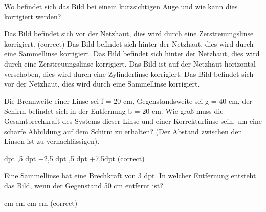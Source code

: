 \documentclass[11pt]{exam}
\begin{document}
\setlength{\voffset}{-0.5in}
\setlength{\headsep}{5pt}

\hspace{2mm}
 \hspace{5mm}
\vspace{4mm}

\begin{questions}

\question Wo befindet sich das Bild bei einem kurzsichtigen Auge und wie kann dies korrigiert werden?

\begin{choices}
	\choice Das Bild befindet sich vor der Netzhaut, dies wird durch eine Zerstreuungslinse korrigiert. (correct)
	\choice Das Bild befindet sich hinter der Netzhaut, dies wird durch eine Sammellinse korrigiert.
	\choice Das Bild befindet sich hinter der Netzhaut, dies wird durch eine Zerstreuungslinse korrigiert.
	\choice Das Bild ist auf der Netzhaut horizontal verschoben, dies wird durch eine Zylinderlinse korrigiert.
	\choice Das Bild befindet sich vor der Netzhaut, dies wird durch eine Sammellinse korrigiert.
\end{choices}

\vspace{3mm}\question Die Brennweite einer Linse sei f = 20 cm, Gegenstandsweite sei g = 40 cm, der Schirm befindet sich in der Entfernung b = 20 cm. Wie groß muss die Gesamtbrechkraft des Systems dieser Linse und einer Korrekturlinse sein, um eine scharfe Abbildung auf dem Schirm zu erhalten? (Der Abstand zwischen den Linsen ist zu vernachlässigen).

\begin{choices}
	 dpt
	,5 dpt
	\choice +2,5 dpt
	,5 dpt
	\choice +7,5dpt (correct)
\end{choices}

\vspace{3mm}\question Eine Sammellinse hat eine Brechkraft von 3 dpt. In welcher Entfernung entsteht das Bild, wenn der Gegenstand 50 cm entfernt ist?

\begin{choices}
	 cm
	 cm
	 cm
	 cm
	\choice 100cm (correct)
\end{choices}


\end{questions}
\end{document}
